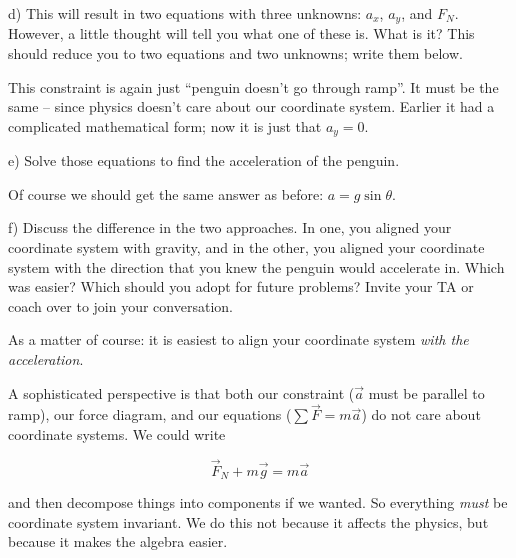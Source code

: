 \documentclass[12pt]{article}
\begin{document}
		d) This will result in two equations with three unknowns: $a_x$, $a_y$, and $F_N$. However, a little thought will
		tell you what one of these is. What is it? This should reduce you to two equations and two unknowns; write them below.
		
		{\color{Red}
			
			This constraint is again just ``penguin doesn't go through ramp''. It must be the same -- since physics doesn't care about our coordinate system. Earlier it had a complicated mathematical form; now it is just that $a_y=0$.
			
	
			
		}
		
		e) Solve those equations to find the acceleration of the penguin.
		
		{\color{Red}
			Of course we should get the same answer as before: $a = g \sin \theta$.
		}
		
		
		f) Discuss the difference in the two approaches. In one, you aligned your coordinate system with gravity, and in the other, you aligned your coordinate system with the direction that you knew the penguin would accelerate in. Which was easier? Which
		should you adopt for future problems? Invite your TA or coach over to join your conversation.
		
		{\color{Red}
			
			As a matter of course: it is easiest to align your coordinate system {\it with the acceleration}.
			
			A sophisticated perspective is that both our constraint ($\vec a$ must be parallel to ramp), our force diagram, and our equations ($\sum \vec F = m \vec a$) do not care about coordinate systems. We could write
			
			$$\vec F_N + m\vec g = m\vec a$$ 
			
			and then decompose things into components if we wanted. So everything {\it must} be coordinate system invariant. We do this not because it affects the physics, but because it makes the algebra easier.
		}

\begin{center}\underline{\hspace{3in}}\end{center}
\end{document}
